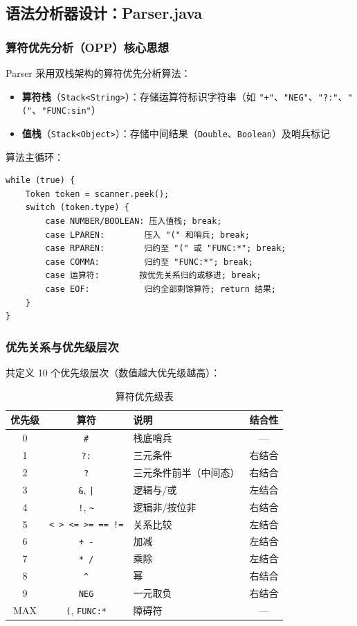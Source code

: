 \documentclass[a4paper]{article}
\begin{document}
\subsection{语法分析器设计：Parser.java}

\subsubsection{算符优先分析（OPP）核心思想}

Parser 采用双栈架构的算符优先分析算法：
\begin{itemize}
    \item \textbf{算符栈}（\texttt{Stack<String>}）：存储运算符标识字符串（如 \texttt{"+"}、\texttt{"NEG"}、\texttt{"?:"}、\texttt{"("}、\texttt{"FUNC:sin"}）
    \item \textbf{值栈}（\texttt{Stack<Object>}）：存储中间结果（\texttt{Double}、\texttt{Boolean}）及哨兵标记
\end{itemize}

算法主循环：
\begin{lstlisting}[caption={OPP 主循环（简化伪代码）}, label={lst:opp-main}]
while (true) {
    Token token = scanner.peek();
    switch (token.type) {
        case NUMBER/BOOLEAN: 压入值栈; break;
        case LPAREN:        压入 "(" 和哨兵; break;
        case RPAREN:        归约至 "(" 或 "FUNC:*"; break;
        case COMMA:         归约至 "FUNC:*"; break;
        case 运算符:        按优先关系归约或移进; break;
        case EOF:           归约全部剩馀算符; return 结果;
    }
}
\end{lstlisting}

\subsubsection{优先关系与优先级层次}

共定义 10 个优先级层次（数值越大优先级越高）：

\begin{table}[H]
\centering
\caption{算符优先级表}
\begin{tabular}{@{}cclc@{}}
\toprule
\textbf{优先级} & \textbf{算符} & \textbf{说明} & \textbf{结合性} \\
\midrule
0 & \texttt{\#} & 栈底哨兵 & --- \\
1 & \texttt{?:} & 三元条件 & 右结合 \\
2 & \texttt{?} & 三元条件前半（中间态） & 右结合 \\
3 & \texttt{\&}, \texttt{|} & 逻辑与/或 & 左结合 \\
4 & \texttt{!}, \texttt{\textasciitilde} & 逻辑非/按位非 & 右结合 \\
5 & \texttt{< > <= >= == !=} & 关系比较 & 左结合 \\
6 & \texttt{+ -} & 加减 & 左结合 \\
7 & \texttt{* /} & 乘除 & 左结合 \\
8 & \texttt{\^} & 幂 & 右结合 \\
9 & \texttt{NEG} & 一元取负 & 右结合 \\
MAX & \texttt{(}, \texttt{FUNC:*} & 障碍符 & --- \\
\bottomrule
\end{tabular}
\label{tab:precedence}
\end{table}
\end{document}
